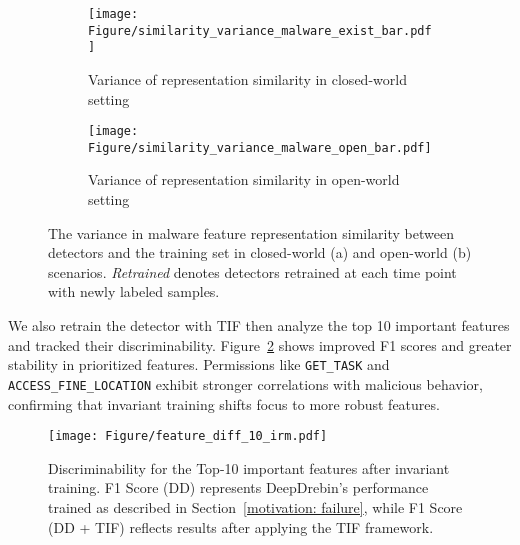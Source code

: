 \begin{figure}[hbt!]
    \centering
    \begin{subfigure}[t]{0.48\textwidth}  
        \texttt{[image: Figure/similarity\_variance\_malware\_exist\_bar.pdf]}
        \caption{Variance of representation similarity in closed-world setting}
    \end{subfigure}
    \begin{subfigure}[t]{0.48\textwidth}  
        \texttt{[image: Figure/similarity\_variance\_malware\_open\_bar.pdf]}
        \caption{Variance of representation similarity in open-world setting}
    \end{subfigure}
    \caption{The variance in malware feature representation similarity between detectors and the training set in closed-world (a) and open-world (b) scenarios. \textit{Retrained} denotes detectors retrained at each time point with newly labeled samples.}
    \label{fig:rq2}
\end{figure}

We also retrain the detector with TIF then analyze the top 10 important features and tracked their discriminability. Figure~\ref{fig:feature_diff_10_irm} shows improved F1 scores and greater stability in prioritized features. Permissions like \verb|GET_TASK| and \verb|ACCESS_FINE_LOCATION| exhibit stronger correlations with malicious behavior, confirming that invariant training shifts focus to more robust features.


\begin{center}
\end{center}

\begin{figure}
    \centering
    \texttt{[image: Figure/feature\_diff\_10\_irm.pdf]}
    \caption{Discriminability for the Top-10 important features after invariant training. F1 Score (DD) represents DeepDrebin's performance~\cite{Grossedeepdrebin} trained as described in Section~\ref{motivation: failure}, while F1 Score (DD + TIF) reflects results after applying the TIF framework.}
    \label{fig:feature_diff_10_irm}
\end{figure}



